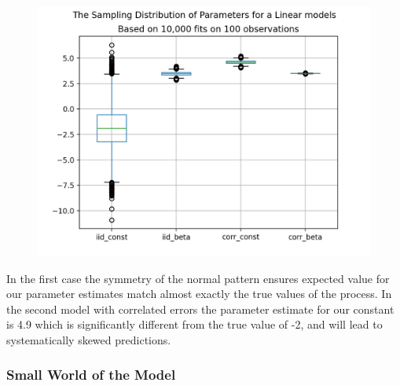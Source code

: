 \documentclass[10pt,a4paper,notitlepage, twocolumn]{article}
\begin{document}
\begin{figure}[H]
  \includegraphics[width=\linewidth]{./Plots/distribution_of_beta1.png}
\end{figure}

In the first case the symmetry of the normal pattern ensures expected value for our parameter estimates match almost exactly the true values of the process. In the second model with correlated errors  the parameter estimate for our constant is 4.9 which is significantly different from the true value of -2, and will lead to systematically skewed predictions.

\subsubsection*{Small World of the Model}
\end{document}
